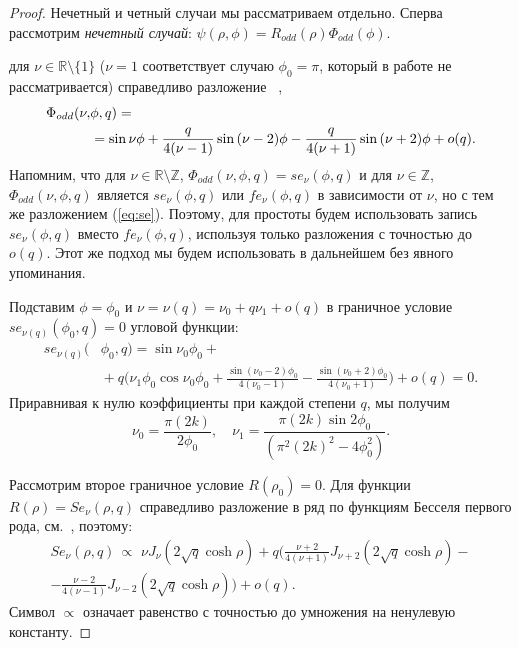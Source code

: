 \begin{theorem}
\end{theorem}
\begin{proof}
Нечетный и четный случаи мы рассматриваем отдельно. Сперва рассмотрим
\textit{нечетный случай}: $\psi(\rho,\phi) = R_{odd}(\rho)\Phi_{odd}(\phi)  $.

для $\nu \in \mathbb{R} \setminus \{1\}$ 
($\nu=1$ соответствует случаю  $\phi_0=\pi$, который в работе не рассматривается)
справедливо разложение ~\cite[\S 2.2]{wref12},
\begin{align}
\Phi_{odd}(\nu, &{} \phi, q)  = \notag\\
	&{} = \sin{\nu\phi} + 
	\frac{q}{4(\nu-1)} \sin{(\nu-2)\phi} -\frac{q}{4(\nu+1)} \sin{(\nu+2)\phi} + o(q). \label{eq:se}
\end{align}
Напомним, что для $\nu \in \mathbb{R} \setminus \mathbb{Z}$, $\Phi_{odd}(\nu, \phi, q) = se_\nu(\phi, q)$ и для  $\nu \in  \mathbb{Z}$, $\Phi_{odd}(\nu, \phi, q)$ является $se_\nu(\phi, q) $ или $fe_\nu(\phi, q)$ в зависимости от $\nu$, но с тем же разложением (\ref{eq:se}). 
Поэтому, для простоты будем использовать запись $se_\nu(\phi, q)$ вместо $fe_\nu(\phi, q)$, используя только разложения с точностью до $o(q)$. Этот же подход мы будем использовать в дальнейшем без явного упоминания.

Подставим  $\phi=\phi_0$ и $\nu=\nu(q) = \nu_0 + q \nu_1 + o(q)$
в граничное условие $se_{\nu(q)}(\phi_0, q)=0$ угловой функции:
 \begin{align*}
 se_{\nu(q)}(& \phi_0, q) =  \sin \nu_0 \phi_0 + \\
&{} + q \biggl( \nu_1 \phi_0 \cos \nu_0 \phi_0 + \frac{\sin(\nu_0-2)\phi_0}{4(\nu_0-1)}  -\frac{\sin(\nu_0+2)\phi_0}{4(\nu_0+1)} \biggr) + o(q) =0.
\end{align*}
Приравнивая к нулю коэффициенты при каждой степени  $q$, мы получим
\begin{equation*}
\nu_0 = \frac{\pi (2k)}{2\phi_0}, \quad \nu_1 = \frac{\pi (2k) \sin 2 \phi_0}{(\pi^2 (2k)^2 - 4\phi_0^2)}.
\end{equation*}

Рассмотрим второе граничное условие $R(\rho_0) = 0$. 
Для функции  $R(\rho)=Se_\nu(\rho, q)$
справедливо разложение в ряд по функциям Бесселя первого рода, см.~\cite[гл. VIII]{mclachlan}, поэтому:
\begin{multline*}
Se_\nu(\rho, q) \,\propto\,\,  \nu J_\nu(2\sqrt{q} \cosh{\rho})  
+q \bigg( \frac{\nu + 2}{4(\nu+1)} J_{\nu+2}(2\sqrt{q} \cosh{\rho}) - \\
- \frac{\nu - 2}{4(\nu-1)} J_{\nu-2}(2\sqrt{q} \cosh{\rho}) \bigg) + o(q).
\end{multline*}
Символ $\propto$ означает равенство с точностью до умножения на ненулевую константу.


\end{proof}

